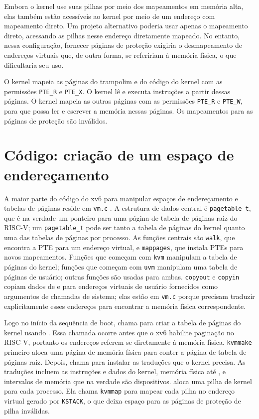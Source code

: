 Embora o kernel use suas pilhas por meio dos mapeamentos em memória alta, elas também estão acessíveis ao kernel por meio de um endereço com mapeamento direto. Um projeto alternativo poderia usar 
apenas o mapeamento direto, acessando as pilhas nesse endereço diretamente mapeado. No entanto, nessa configuração, fornecer páginas de proteção exigiria o desmapeamento de endereços virtuais que, 
de outra forma, se refeririam à memória física, o que dificultaria seu uso.

O kernel mapeia as páginas do trampolim e do código do kernel com as permissões \lstinline{PTE_R} e \lstinline{PTE_X}. O kernel lê e executa instruções a partir dessas páginas. O kernel mapeia as 
outras páginas com as permissões \lstinline{PTE_R} e \lstinline{PTE_W}, para que possa ler e escrever a memória nessas páginas. Os mapeamentos para as páginas de proteção são inválidos.

\section{Código: criação de um espaço de endereçamento}

A maior parte do código do xv6 para manipular espaços de endereçamento e
tabelas de páginas reside em {\tt vm.c}
.
A estrutura de dados central é {\tt pagetable\_t}, que
é na verdade um ponteiro para uma página de tabela de páginas raiz do RISC-V;
um {\tt pagetable\_t} pode ser tanto a tabela de páginas do kernel
quanto uma das tabelas de páginas por processo.
As funções centrais são {\tt walk},
que encontra a PTE para um endereço virtual,
e {\tt mappages}, que instala PTEs para novos mapeamentos.
Funções que começam com {\tt kvm} manipulam
a tabela de páginas do kernel; funções que começam com {\tt uvm}
manipulam uma tabela de páginas de usuário; outras funções são
usadas para ambas.
{\tt copyout} e {\tt copyin} copiam dados de e para
endereços virtuais de usuário fornecidos como argumentos de chamadas de sistema;
elas estão em {\tt vm.c} porque precisam traduzir explicitamente esses endereços
para encontrar a memória física correspondente.

Logo no início da sequência de boot,
chama
para criar a tabela de páginas do kernel usando
.
Essa chamada ocorre antes que o xv6 habilite paginação no RISC-V,
portanto os endereços referem-se diretamente à memória física.
\lstinline{kvmmake}
primeiro aloca uma página de memória física para conter a página de tabela de páginas raiz.
Depois, chama
para instalar as traduções que o kernel precisa.
As traduções incluem as instruções e dados do kernel, memória física até
,
e intervalos de memória que na verdade são dispositivos.
aloca uma pilha de kernel para cada
processo. Ela chama \lstinline{kvmmap} para mapear cada pilha no endereço virtual gerado por
\lstinline{KSTACK}, o que deixa espaço para as páginas de proteção de pilha inválidas.


